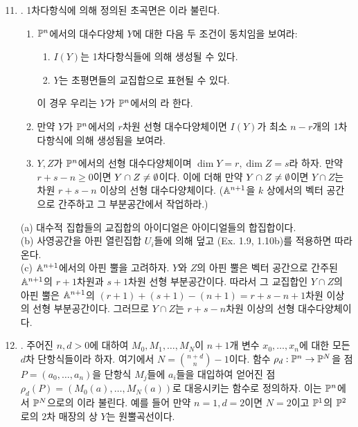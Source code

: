 	\begin{enumerate}[label=\tb{2.\arabic*.},itemindent=0mm,itemsep=4mm]
		\setcounter{enumi}{10}
		\item {}. 1차다항식에 의해 정의된 초곡면은 이라 불린다.
		\begin{enumerate}[label=(\alph*)]
			\item $\mathbb{P}^n$에서의 대수다양체 $Y$에 대한 다음 두 조건이 동치임을 보여라:
			\begin{enumerate}[label=(\roman*)]
				\item $I(Y)$는 1차다항식들에 의해 생성될 수 있다.
				\item $Y$는 초평면들의 교집합으로 표현될 수 있다.
			\end{enumerate}
			이 경우 우리는 $Y$가 $\mathbb{P}^n$에서의 라 한다.
			\item 만약 $Y$가 $\mathbb{P}^n$에서의 $r$차원 선형 대수다양체이면
			$I(Y)$가 최소 $n-r$개의 1차다항식에 의해 생성됨을 보여라.
			\item $Y,Z$가 $\mathbb{P}^n$에서의 선형 대수다양체이며 $\dim Y=r,\dim Z=s$라 하자.
			만약 $r+s-n\ge 0$이면 $Y\cap Z\ne\emptyset$이다.
			이에 더해 만약 $Y\cap Z\ne\emptyset$이면 $Y\cap Z$는 차원 $r+s-n$ 이상의 선형 대수다양체이다.
			($\mathbb{A}^{n+1}$을 $k$ 상에서의 벡터 공간으로 간주하고 그 부분공간에서 작업하라.)
		\end{enumerate}
		\sol (a) 대수적 집합들의 교집합의 아이디얼은 아이디얼들의 합집합이다.\\
		(b) 사영공간을 아핀 열린집합 $U_i$들에 의해 덮고 (Ex. 1.9, 1.10b)를 적용하면 따라온다.\\
		(c) $\mathbb{A}^{n+1}$에서의 아핀 뿔을 고려하자. $Y$와 $Z$의 아핀 뿔은 벡터 공간으로 간주된 $\mathbb{A}^{n+1}$의
		$r+1$차원과 $s+1$차원 선형 부분공간이다. 따라서 그 교집합인 $Y\cap Z$의 아핀 뿔은
		$\mathbb{A}^{n+1}$의 $(r+1)+(s+1)-(n+1)=r+s-n+1$차원 이상의 선형 부분공간이다.
		그러므로 $Y\cap Z$는 $r+s-n$차원 이상의 선형 대수다양체이다.
		\item {}. 주어진 $n,d>0$에 대하여 $M_0,M_1,\ldots,M_N$이
		$n+1$개 변수 $x_0,\ldots,x_n$에 대한 모든 $d$차 단항식들이라 하자. 여기에서 $N=\binom{n+d}{n}-1$이다.
		함수 $\rho_d:\mathbb{P}^n\rightarrow\mathbb{P}^N$을 점 $P=(a_0,\ldots,a_n)$을 단항식 $M_j$들에 $a_i$들을 대입하여 얻어진
		점 $\rho_d(P)=(M_0(a),\ldots,M_N(a))$로 대응시키는 함수로 정의하자.
		이는 $\mathbb{P}^n$에서 $\mathbb{P}^N$으로의 이라 불린다.
		예를 들어 만약 $n=1,d=2$이면 $N=2$이고 $\mathbb{P}^1$의 $\mathbb{P}^2$로의 $2$차 매장의 상 $Y$는 원뿔곡선이다.
		\begin{enumerate}[label=(\alph*)]

\end{enumerate}
\end{enumerate}
